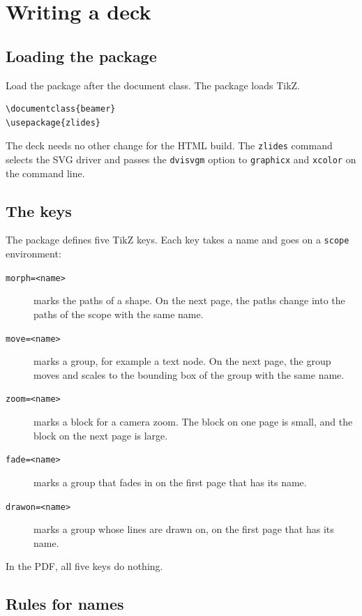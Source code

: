 \documentclass[11pt]{article}
\newcommand{\cmd}[1]{\texttt{#1}}
\begin{document}
\section{Writing a deck}

\subsection{Loading the package}

Load the package after the document class. The package loads TikZ.
\begin{lstlisting}
\documentclass{beamer}
\usepackage{zlides}
\end{lstlisting}
The deck needs no other change for the HTML build. The \cmd{zlides} command
selects the SVG driver and passes the \cmd{dvisvgm} option to \cmd{graphicx} and
\cmd{xcolor} on the command line.

\subsection{The keys}

The package defines five TikZ keys. Each key takes a name and goes on a
\cmd{scope} environment:

\begin{description}
	\item[\cmd{morph=<name>}] marks the paths of a shape. On the next page, the
	      paths change into the paths of the scope with the same name.
	\item[\cmd{move=<name>}] marks a group, for example a text node. On the next
	      page, the group moves and scales to the bounding box of the group with the
	      same name.
	\item[\cmd{zoom=<name>}] marks a block for a camera zoom. The block on one
	      page is small, and the block on the next page is large.
	\item[\cmd{fade=<name>}] marks a group that fades in on the first page that has
	      its name.
	\item[\cmd{drawon=<name>}] marks a group whose lines are drawn on, on the first
	      page that has its name.
\end{description}

In the PDF, all five keys do nothing.

\subsection{Rules for names}
\end{document}
